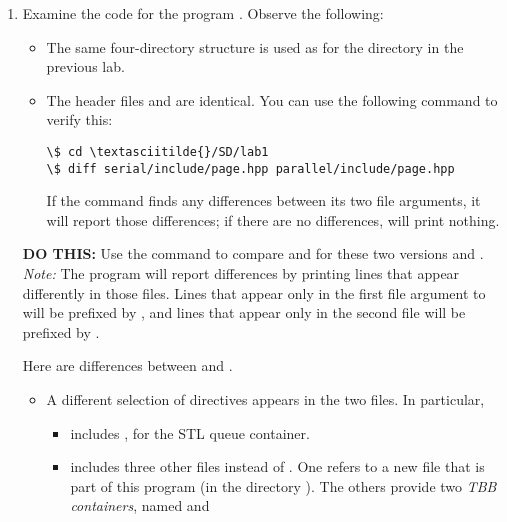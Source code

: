 \documentclass[letterpaper,10pt,openany,oneside]{sphinxmanual}
\begin{document}
\begin{enumerate}
\item {} 
Examine the code for the program . Observe the following:
\begin{itemize}
\item {} 
The same four-directory structure is used as for the 
directory in the previous lab.

\item {} 
The header files  and
 are identical. You can use the
following  command to verify this:

\begin{Verbatim}[commandchars=\\\{\}]
\$ cd \textasciitilde{}/SD/lab1
\$ diff serial/include/page.hpp parallel/include/page.hpp
\end{Verbatim}

If the  command finds any differences between its two file
arguments, it will report those differences; if there are no
differences,  will print nothing.

\end{itemize}

\textbf{DO THIS:} Use the  command to compare  and
 for these two versions  and .
\emph{Note:} The  program will report differences by printing
lines that appear differently in those files. Lines that appear only
in the first file argument to  will be prefixed by \code{\textless{}}, and
lines that appear only in the second file will be prefixed by \code{\textgreater{}}.

Here are differences between  and
.
\begin{itemize}
\item {} 
A different selection of  directives appears in the
two files. In particular,
\begin{itemize}
\item {} 
 includes , for the STL
queue container.

\item {} 
 includes three other files
instead of . One refers to a new file
 that is part of this program (in the
directory ). The others provide two \emph{TBB
containers}, named  and


\end{itemize}
\end{itemize}
\end{enumerate}
\end{document}
